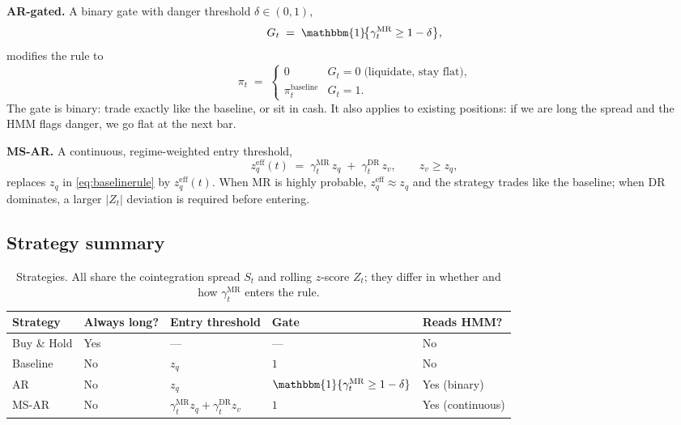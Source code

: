 \textbf{AR-gated.} A binary gate with danger threshold $\delta \in (0,1)$,
\begin{equation}\label{eq:argate}
    G_t \;=\; \mathbbm{1}\!\bigl\{\gamma_t^{\mathrm{MR}} \geq 1-\delta\bigr\},
\end{equation}
modifies the rule to
\begin{equation}\label{eq:arpositionrule}
    \pi_t \;=\;
    \begin{cases}
        0 & G_t = 0 \;\text{(liquidate, stay flat),}\\
        \pi_t^{\mathrm{baseline}} & G_t = 1.
    \end{cases}
\end{equation}
The gate is binary: trade exactly like the baseline, or sit in cash. It also applies to existing positions: if we are long the spread and the HMM flags danger, we go flat at the next bar.

\textbf{MS-AR.} A continuous, regime-weighted entry threshold,
\begin{equation}\label{eq:msarthreshold}
    z_q^{\mathrm{eff}}(t) \;=\; \gamma_t^{\mathrm{MR}}\, z_q \;+\; \gamma_t^{\mathrm{DR}}\, z_v,
    \qquad z_v \geq z_q,
\end{equation}
replaces $z_q$ in \eqref{eq:baselinerule} by $z_q^{\mathrm{eff}}(t)$. When MR is highly probable, $z_q^{\mathrm{eff}} \approx z_q$ and the strategy trades like the baseline; when DR dominates, a larger $|Z_t|$ deviation is required before entering.

\subsection{Strategy summary}

\begin{table}[H]
\centering
\caption{Strategies. All share the cointegration spread $S_t$ and rolling $z$-score $Z_t$; they differ in whether and how $\gamma_t^{\mathrm{MR}}$ enters the rule.}
\label{tab:strategy_definitions}
\small
\begin{tabular}{lllll}
\toprule
\textbf{Strategy} & \textbf{Always long?} & \textbf{Entry threshold} & \textbf{Gate} & \textbf{Reads HMM?} \\
\midrule
Buy \& Hold & Yes & --- & --- & No \\
Baseline    & No  & $z_q$ & $1$ & No \\
AR          & No  & $z_q$ & $\mathbbm{1}\{\gamma_t^{\mathrm{MR}} \geq 1-\delta\}$ & Yes (binary) \\
MS-AR       & No  & $\gamma_t^{\mathrm{MR}} z_q + \gamma_t^{\mathrm{DR}} z_v$ & $1$ & Yes (continuous) \\
\bottomrule
\end{tabular}
\end{table}


